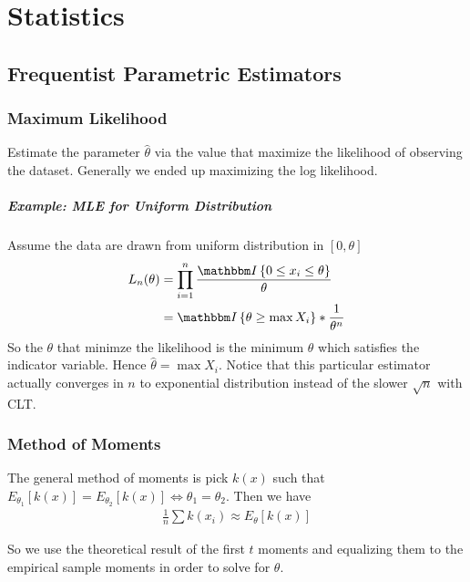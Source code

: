 \chapter{Statistics}

\section{Frequentist Parametric Estimators}

\subsection{Maximum Likelihood} 
Estimate the parameter $\hat{\theta}$ via the value that maximize the likelihood of observing the dataset. Generally we ended up maximizing the log likelihood. 

\paragraph{Example: MLE for Uniform Distribution} 
Assume the data are drawn from uniform distribution in $[0, \theta]$
    \begin{align*}
        L_n(\theta) 
        & = \prod_{i=1}^n \frac{\indic{0 \leq x_i \leq \theta}}{\theta}\\
        & = \indic{\theta \geq \max{X_i}} * \frac{1}{\theta^n}
    \end{align*}
So the $\theta$ that minimze the likelihood is the minimum $\theta$ which satisfies the indicator variable. Hence $\hat{\theta} = \max{X_i}$. Notice that this particular estimator actually converges in $n$ to exponential distribution instead of the slower $\sqrt{n}$ with CLT. 

\subsection{Method of Moments}
The general method of moments is pick $k(x)$ such that $E_{\theta_1}[k(x)] = E_{\theta_2}[k(x)] \Longleftrightarrow \theta_1 = \theta_2$. Then we have 
    \begin{align*}
        \frac{1}{n} \sum k(x_i) \approx E_\theta[k(x)]
    \end{align*}

So we use the theoretical result of the first $t$ moments and equalizing them to the empirical sample moments in order to solve for $\theta$. 

